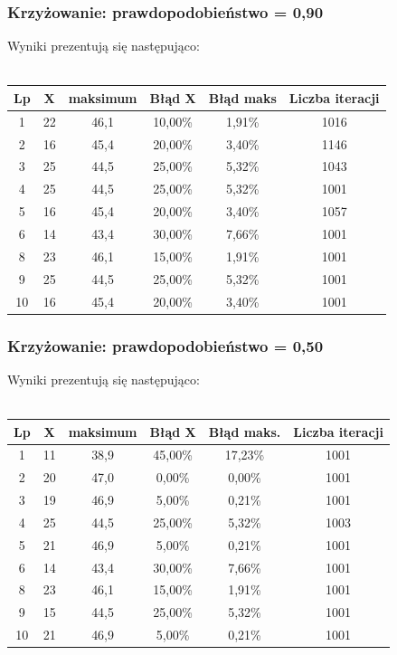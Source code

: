 \documentclass[a4paper,11pt]{article}
\begin{document}
				\subsubsection{Krzyżowanie: prawdopodobieństwo = 0,90}
					Wyniki prezentują się następująco:\\~\\
					\begin{tabular}{|c|c|c|c|c|c|}
						\hline 
						Lp & X & maksimum & Błąd X & Błąd maks &Liczba iteracji\\
						\hline
						1 & 22 & 46,1 & 10,00\% &1,91\% & 1016 \\\hline
						2 & 16 & 45,4 & 20,00\% &3,40\% & 1146  \\\hline
						3 & 25 & 44,5 & 25,00\% &5,32\% &1043 \\\hline
						4 & 25 & 44,5 & 25,00\% &5,32\% &1001 \\\hline
						5 & 16 & 45,4 & 20,00\% &3,40\% &1057 \\\hline
						6 & 14 & 43,4 & 30,00\% &7,66\% &1001 \\\hline
						8 & 23 & 46,1 & 15,00\% &1,91\% &1001 \\\hline
						9 & 25 & 44,5 & 25,00\% &5,32\% &1001 \\\hline
						10& 16 & 45,4 & 20,00\% &3,40\%&1001 \\\hline
					\end{tabular}
				\subsubsection{Krzyżowanie: prawdopodobieństwo = 0,50}
					Wyniki prezentują się następująco:\\~\\
					\begin{tabular}{|c|c|c|c|c|c|}
						\hline 
						Lp & X & maksimum & Błąd X & Błąd maks. & Liczba iteracji\\
						\hline
						1 & 11 & 38,9 & 45,00\% &17,23\% &1001 \\\hline
						2 & 20 & 47,0 & 0,00\% &0,00\% &1001  \\\hline
						3 & 19 & 46,9 & 5,00\% & 0,21\%&1001 \\\hline
						4 & 25 & 44,5 & 25,00\% &5,32\% &1003 \\\hline
						5 & 21 & 46,9 & 5,00\% & 0,21\%&1001 \\\hline
						6 & 14 & 43,4 & 30,00\% & 7,66\%&1001 \\\hline
						8 & 23 & 46,1 & 15,00\% & 1,91\%&1001 \\\hline
						9 & 15 & 44,5 & 25,00\% & 5,32\%&1001 \\\hline
						10& 21 & 46,9 & 5,00\% &0,21\% &1001 \\\hline
					\end{tabular} 
\end{document}
